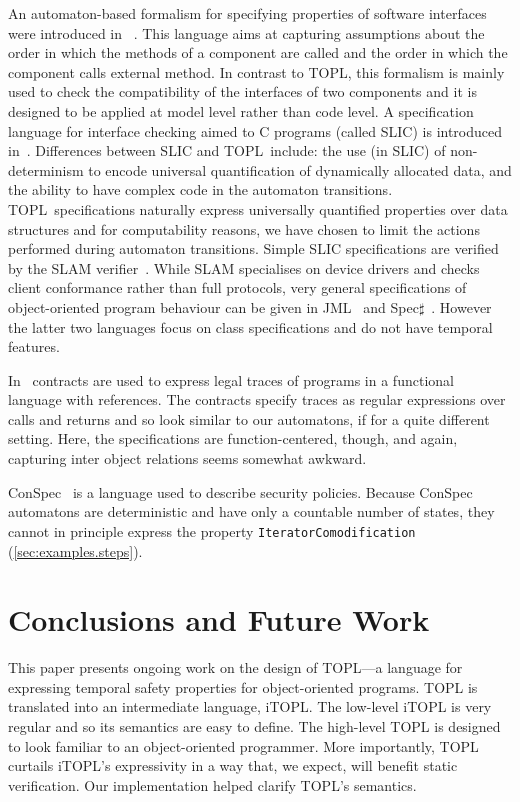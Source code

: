 \documentclass{sigplanconf} %
\newcommand{\TPL}{TOPL}
\theoremstyle{definition}
\theoremstyle{remark}
\begin{document}
An automaton-based formalism for specifying properties of software interfaces were introduced in~\cite{dblp:conf/sigsoft/AlfaroH01} . 
This language aims at capturing assumptions about the order in which the methods of a component are called and the order in which the component calls external method.
In contrast to \TPL, this formalism is mainly used to check the compatibility of the interfaces of two components and it is designed to be applied at  model level rather than code level. A specification language for interface checking aimed to C programs (called SLIC) is introduced in~\cite{ball2002}.  
Differences between SLIC and \TPL \ include: the use (in SLIC) of
non-determinism to encode universal quantification of dynamically allocated data, and the  ability to have complex code in the automaton transitions. 
\TPL \ specifications naturally express universally quantified
properties over data structures and for computability reasons,  we
have chosen to limit the  actions performed during automaton transitions. 
Simple SLIC specifications are verified by  the SLAM verifier~\cite{dblp:conf/cav/ballr01}.
While SLAM specialises on device drivers and checks client conformance rather than full protocols, 
very general specifications of object-oriented program behaviour can be given in JML~\cite{jml} and Spec$\sharp$~\cite{DBLP:journals/jot/BarnettDFLS04}. However the latter two languages focus on class specifications and do not have temporal features.

In~\cite{disney2011} contracts are used to express legal traces of
programs in a functional language with references. The contracts
specify traces as regular expressions over calls and returns and so
look similar to our automatons, if for a quite different
setting. Here, the specifications are function-centered, though, and
again, capturing inter object relations seems somewhat awkward.

ConSpec~\cite{DBLP:journals/entcs/AktugN08} is a language used to describe security policies.
Because ConSpec automatons are deterministic and have only a countable number of states, they cannot in principle express the property \texttt{IteratorComodification} (\autoref{sec:examples.steps}).

\section{Conclusions and Future Work}\label{sec:conclusions} %

This paper presents ongoing work on the design of TOPL---a language for expressing temporal safety properties for object-oriented programs.
TOPL is translated into an intermediate language, iTOPL\null.
The low-level iTOPL is very regular and so its semantics are easy to define.
The high-level TOPL is designed to look familiar to an object-oriented programmer.
More importantly, TOPL curtails iTOPL's expressivity in a way that, we expect, will benefit static verification.
Our implementation helped clarify TOPL's semantics.
\end{document}
